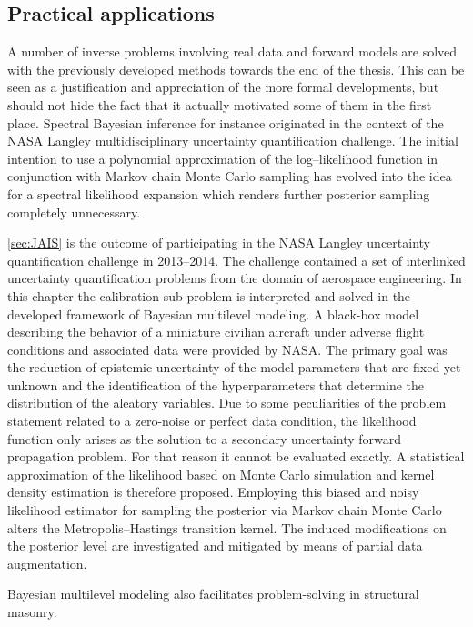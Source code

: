 \begin{refsection}
\subsection{Practical applications}
A number of inverse problems involving real data and forward models are solved with the previously developed methods towards the end of the thesis.
This can be seen as a justification and appreciation of the more formal developments, but should not hide the fact that it actually motivated some of them in the first place.
Spectral Bayesian inference for instance originated in the context of the NASA Langley multidisciplinary uncertainty quantification challenge.
The initial intention to use a polynomial approximation of the log--likelihood function in conjunction with Markov chain Monte Carlo sampling
has evolved into the idea for a spectral likelihood expansion which renders further posterior sampling completely unnecessary.
\par %
\cref{sec:JAIS} is the outcome of participating in the NASA Langley uncertainty quantification challenge in 2013--2014.
The challenge contained a set of interlinked uncertainty quantification problems from the domain of aerospace engineering.
In this chapter the calibration sub-problem is interpreted and solved in the developed framework of Bayesian multilevel modeling.
A black-box model describing the behavior of a miniature civilian aircraft under adverse flight conditions and associated data were provided by NASA.
The primary goal was the reduction of epistemic uncertainty of the model parameters that are fixed yet unknown
and the identification of the hyperparameters that determine the distribution of the aleatory variables.
Due to some peculiarities of the problem statement related to a zero-noise or perfect data condition,
the likelihood function only arises as the solution to a secondary uncertainty forward propagation problem.
For that reason it cannot be evaluated exactly.
A statistical approximation of the likelihood based on Monte Carlo simulation and kernel density estimation is therefore proposed.
Employing this biased and noisy likelihood estimator for sampling the posterior via Markov chain Monte Carlo alters the Metropolis--Hastings transition kernel.
The induced modifications on the posterior level are investigated and mitigated by means of partial data augmentation.
\par %
Bayesian multilevel modeling also facilitates problem-solving in structural masonry.

\end{refsection}
